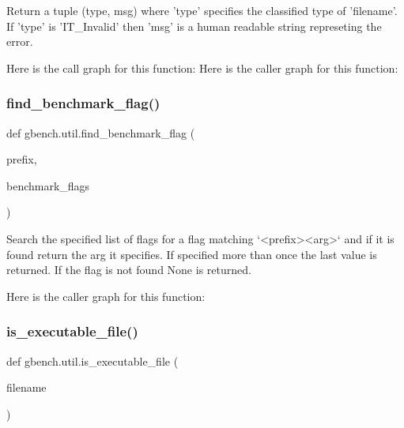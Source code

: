 \begin{DoxyVerb}Return a tuple (type, msg) where 'type' specifies the classified type
of 'filename'. If 'type' is 'IT_Invalid' then 'msg' is a human readable
string represeting the error.
\end{DoxyVerb}
 Here is the call graph for this function\+:
Here is the caller graph for this function\+:
\mbox{\label{namespacegbench_1_1util_adb11119409b105a464f238f67d49a33f}} 
\subsubsection{\texorpdfstring{find\+\_\+benchmark\+\_\+flag()}{find\_benchmark\_flag()}}
{\footnotesize\ttfamily def gbench.\+util.\+find\+\_\+benchmark\+\_\+flag (\begin{DoxyParamCaption}\item[{}]{prefix,  }\item[{}]{benchmark\+\_\+flags }\end{DoxyParamCaption})}

\begin{DoxyVerb}Search the specified list of flags for a flag matching `<prefix><arg>` and
if it is found return the arg it specifies. If specified more than once the
last value is returned. If the flag is not found None is returned.
\end{DoxyVerb}
 Here is the caller graph for this function\+:
\mbox{\label{namespacegbench_1_1util_ab892754dc0be3bbe4785bf4610a8cc76}} 
\subsubsection{\texorpdfstring{is\+\_\+executable\+\_\+file()}{is\_executable\_file()}}
{\footnotesize\ttfamily def gbench.\+util.\+is\+\_\+executable\+\_\+file (\begin{DoxyParamCaption}\item[{}]{filename }\end{DoxyParamCaption})}


